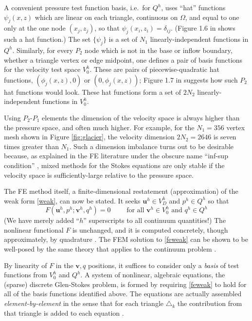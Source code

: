\documentclass[letterpaper,final,12pt,reqno]{amsart}
\newcommand{\bu}{\mathbf{u}}
\newcommand{\bv}{\mathbf{v}}
\begin{document}
A convenient pressure test function basis, i.e.~for $Q^h$, uses ``hat'' functions $\psi_j(x,z)$ which are linear on each triangle, continuous on $\Omega$, and equal to one only at the one node $(x_j,z_j)$, so that $\psi_j(x_i,z_i) = \delta_{ij}$.  (Figure 1.6 in \cite{Elmanetal2014} shows such a hat function.)  The set $\{\psi_j\}$ is a set of $N_1$ linearly-independent functions in $Q^h$.  Similarly, for every $P_2$ node which is not in the base or inflow boundary, whether a triangle vertex or edge midpoint, one defines a pair of basis functions for the velocity test space $V_0^h$.  These are pairs of piecewise-quadratic hat functions, $(\phi_j(x,z),0)$ or $(0,\phi_j(x,z))$; Figure 1.7 in \cite{Elmanetal2014} suggests how such $P_2$ hat functions would look.  These hat functions form a set of $2N_2$ linearly-independent functions in $V_0^h$.

Using $P_2$-$P_1$ elements the dimension of the velocity space is always higher than the pressure space, and often much higher.  For example, for the $N_1=356$ vertex mesh shown in Figure \ref{fig:glacier}, the velocity dimension $2N_2=2646$ is seven times greater than $N_1$.  Such a dimension imbalance turns out to be desirable because, as explained in the FE literature under the obscure name ``inf-sup condition'' \cite{Braess2007,BuelerBook,Elmanetal2014}, mixed methods for the Stokes equations are only stable if the velocity space is sufficiently-large relative to the pressure space.

The FE method itself, a finite-dimensional restatement (approximation) of the weak form \eqref{weak}, can now be stated.  It seeks $\bu^h \in V_D^h$ and $p^h \in Q^h$ so that
\begin{equation}
F(\bu^h,p^h;\bv^h,q^h) = 0 \qquad \text{ for all } \bv^h\in V_0^h \text{ and } q^h\in Q^h  \label{feweak}
\end{equation}
(We have merely added ``$h$'' superscripts to all continuum quantities!)  The nonlinear functional $F$ is unchanged, and it is computed concretely, though approximately, by quadrature \cite{BuelerBook,Elmanetal2014}.  The FEM solution to \eqref{feweak} can be shown to be well-posed by the same theory that applies to the continuum problem \cite[Theorem 4.3]{JouvetRappaz2011}.

By linearity of $F$ in the $\bv,q$ positions, it suffices to consider only a \emph{basis} of test functions from $V_0^h$ and $Q^h$.  A system of nonlinear, algebraic equations, the (sparse) discrete Glen-Stokes problem, is formed by requiring \eqref{feweak} to hold for all of the basis functions identified above.  The equations are actually assembled \emph{element-by-element} in the sense that for each triangle $\triangle_k$ the contribution from that triangle is added to each equation \cite[Chapter 10]{BuelerBook}.
\end{document}
